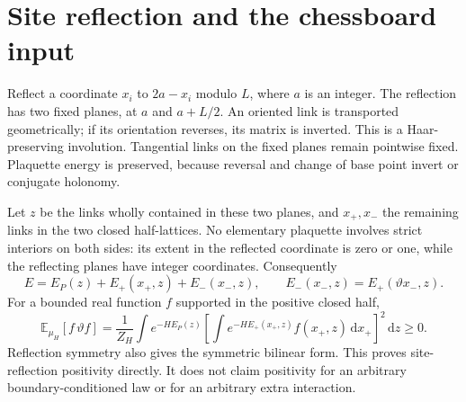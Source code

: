 \documentclass[11pt]{article}
\theoremstyle{remark}
\newcommand{\E}{\mathbb E}
\newcommand{\dd}{\,\mathrm d}
\begin{document}
\section{Site reflection and the chessboard input}
\label{sec:reflection}
Reflect a coordinate $x_i$ to $2a-x_i$ modulo $L$, where $a$ is an integer.
The reflection has two fixed planes, at $a$ and $a+L/2$. An oriented link
is transported geometrically; if its orientation reverses, its matrix is
inverted. This is a Haar-preserving involution. Tangential links on the
fixed planes remain pointwise fixed. Plaquette energy is preserved,
because reversal and change of base point invert or conjugate holonomy.

Let $z$ be the links wholly contained in these two planes, and $x_+,x_-$
the remaining links in the two closed half-lattices. No elementary
plaquette involves strict interiors on both sides: its extent in the
reflected coordinate is zero or one, while the reflecting planes have
integer coordinates. Consequently
\[
 E=E_P(z)+E_+(x_+,z)+E_-(x_-,z),
 \qquad E_-(x_-,z)=E_+(\vartheta x_-,z).
\]
For a bounded real function $f$ supported in the positive closed half,
\begin{equation}
 \E_{\mu_H}[f\,\vartheta f]
 =\frac1{Z_H}\int e^{-HE_P(z)}
   \left[\int e^{-HE_+(x_+,z)}f(x_+,z)\dd x_+\right]^2\dd z\ge0.
 \label{eq:rp}
\end{equation}
Reflection symmetry also gives the symmetric bilinear form. This proves
site-reflection positivity directly. It does not claim positivity for an
arbitrary boundary-conditioned law or for an arbitrary extra interaction.
\end{document}
